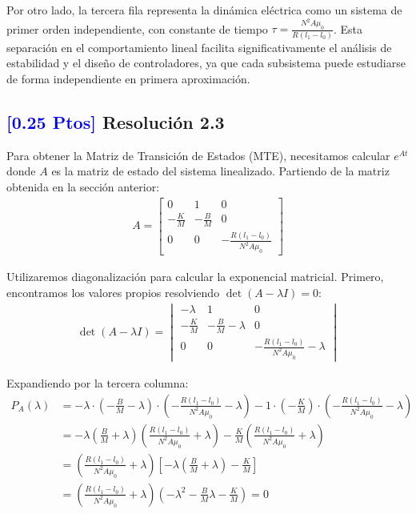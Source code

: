 \documentclass[
  11pt,
  letterpaper,
   addpoints,
   answers
  ]{exam}
\begin{document}
\begin{solution}
Por otro lado, la tercera fila representa la dinámica eléctrica como un sistema de primer orden independiente, con constante de tiempo $\tau = \frac{N^2 A \mu_0}{R(l_1 - l_0)}$. Esta separación en el comportamiento lineal facilita significativamente el análisis de estabilidad y el diseño de controladores, ya que cada subsistema puede estudiarse de forma independiente en primera aproximación.

\subsection*{\textcolor{blue}{[0.25 Ptos]} Resolución 2.3}

Para obtener la Matriz de Transición de Estados (MTE), necesitamos calcular $e^{At}$ donde $A$ es la matriz de estado del sistema linealizado. Partiendo de la matriz obtenida en la sección anterior:
\begin{align}
A = \begin{bmatrix}
0 & 1 & 0 \\
-\displaystyle\frac{K}{M} & -\displaystyle\frac{B}{M} & 0 \\
0 & 0 & -\displaystyle\frac{R(l_1 - l_0)}{N^2 A \mu_0}
\end{bmatrix}
\end{align}

Utilizaremos diagonalización para calcular la exponencial matricial. Primero, encontramos los valores propios resolviendo $\det(A - \lambda I) = 0$:
\begin{align}
\det(A - \lambda I) = \begin{vmatrix}
-\lambda & 1 & 0 \\
-\displaystyle\frac{K}{M} & -\displaystyle\frac{B}{M} - \lambda & 0 \\
0 & 0 & -\displaystyle\frac{R(l_1 - l_0)}{N^2 A \mu_0} - \lambda
\end{vmatrix}
\end{align}

Expandiendo por la tercera columna:
\begin{align}
P_A(\lambda) &= -\lambda \cdot \left(-\frac{B}{M} - \lambda\right) \cdot \left(-\frac{R(l_1 - l_0)}{N^2 A \mu_0} - \lambda\right) - 1 \cdot \left(-\frac{K}{M}\right) \cdot \left(-\frac{R(l_1 - l_0)}{N^2 A \mu_0} - \lambda\right)\\
&= -\lambda \left(\frac{B}{M} + \lambda\right)\left(\frac{R(l_1 - l_0)}{N^2 A \mu_0} + \lambda\right) - \frac{K}{M}\left(\frac{R(l_1 - l_0)}{N^2 A \mu_0} + \lambda\right)\\
&= \left(\frac{R(l_1 - l_0)}{N^2 A \mu_0} + \lambda\right)\left[-\lambda\left(\frac{B}{M} + \lambda\right) - \frac{K}{M}\right]\\
&= \left(\frac{R(l_1 - l_0)}{N^2 A \mu_0} + \lambda\right)\left(-\lambda^2 - \frac{B}{M}\lambda - \frac{K}{M}\right) = 0
\end{align}


\end{solution}
\end{document}

